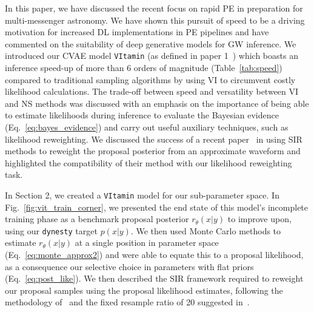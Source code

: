 \documentclass[a4paper]{jpconf}
\begin{document}
In this paper, we have discussed the recent focus on rapid PE in preparation for multi-messenger astronomy. We have shown this pursuit of speed to be a driving motivation for increased \ac{DL} implementations in PE pipelines and have commented on the suitability of deep generative models for GW inference. We introduced our CVAE model \texttt{VItamin} (as defined in paper 1~\cite{vitpaper}) which boasts an inference speed-up of more than 6 orders of magnitude (Table~\ref{tab:speed}) compared to traditional sampling algorithms by using VI to circumvent costly likelihood calculations. The trade-off between speed and versatility between VI and NS methods was discussed with an emphasis on the importance of being able to estimate likelihoods during inference to evaluate the Bayesian evidence (Eq.~\ref{eq:bayes_evidence}) and carry out useful auxiliary techniques, such as likelihood reweighting. We discussed the success of a recent paper~\cite{resample_aus} in using SIR methods to reweight the proposal posterior from an approximate waveform and highlighted the compatibility of their method with our likelihood reweighting task.

In Section 2, we created a \texttt{VItamin} model for our sub-parameter space. In Fig.~\ref{fig:vit_train_corner}, we presented the end state of this model's incomplete training phase as a benchmark proposal posterior $r_\theta(x|y)$ to improve upon, using our \texttt{dynesty} target $p(x|y)$. We then used Monte Carlo methods to estimate $r_\theta(x|y)$ at a single position in parameter space (Eq.~\ref{eq:monte_approx2}) and were able to equate this to a proposal likelihood, as a consequence our selective choice in parameters with flat priors (Eq.~\ref{eq:post_like}). We then described the SIR framework required to reweight our proposal samples using the proposal likelihood estimates, following the methodology of~\cite{resample_aus} and the fixed resample ratio of 20 suggested in~\cite{brian2006resampling}.
\end{document}

